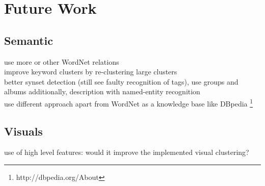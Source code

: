 %
\section{Future Work}
\label{sec_future}


\subsection{Semantic}
use more or other WordNet relations\\
improve keyword clusters by re-clustering large clusters\\
better synset detection (still see faulty recognition of tags), use groups and albums additionally, description with named-entity recognition \\
use different approach apart from WordNet as a knowledge base like DBpedia \footnote{http://dbpedia.org/About}

\subsection{Visuals}

use of high level features: would it improve the implemented visual clustering?
